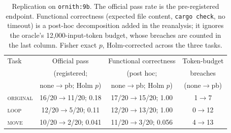 \documentclass[smallcondensed,natbib]{svjour3}
\begin{document}
\begin{table}
\caption{Replication of Study 1 on \texttt{ornith:9b} (dense 9B,
$n=20$ per cell, seeds 42--61, same suite and arms). Point estimates;
confidence intervals and Holm-corrected tests in the text. $\Delta R <
0$ means the playbook \emph{adds} rounds. Wall seconds are means
under the 300\,s cap (censored; six of the eight timeouts fall in
playbook arms, so those columns are lower bounds). On this executor the
playbook lengthens trajectories and costs net tokens on every task;
Table~\ref{tab:ornith-correct} separates functional correctness from
the token budget.}
\label{tab:ornith}
\end{table}

\begin{table}
\caption{Replication on \texttt{ornith:9b}. The official pass rate is
the pre-registered endpoint. Functional correctness (expected file
content, \texttt{cargo check}, no timeout) is a post-hoc decomposition
added in the reanalysis; it ignores the oracle's 12{,}000-input-token
budget, whose breaches are counted in the last column. Fisher exact
$p$, Holm-corrected across the three tasks.}
\label{tab:ornith-correct}
\begin{tabular}{lccc}
\toprule
Task & Official pass & Functional correctness & Token-budget \\
 & (registered; & (post hoc; & breaches \\
 & none$\to$pb; Holm $p$) & none$\to$pb; Holm $p$) & (none$\to$pb) \\
\midrule
\textsc{original} & 16/20$\to$11/20; 0.18 & 17/20$\to$15/20; 1.00 & 1$\to$7 \\
\textsc{loop} & 12/20$\to$5/20; 0.11 & 12/20$\to$13/20; 1.00 & 0$\to$12 \\
\textsc{move} & 10/20$\to$2/20; 0.041 & 11/20$\to$3/20; 0.056 & 4$\to$13 \\
\bottomrule
\end{tabular}
\end{table}
\end{document}
